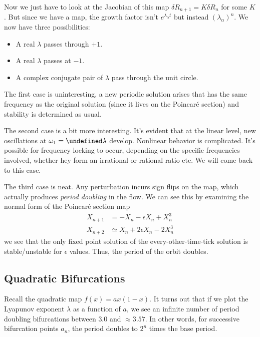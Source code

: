 \documentclass[12pt]{article}
\let\Im\undefined
\DeclareMathOperator{\Im}{Im}
\begin{document}
Now we just have to look at the Jacobian of this map
$\delta R_{n+1} = K \delta R_n$
for some $K$. But since we have a map, the growth factor isn't
$e^{\lambda_\alpha t}$ but instead $(\lambda_\alpha)^n$. We now have three
possibilities:
\begin{itemize}
    \item A real $\lambda$ passes through $+1$.
    \item A real $\lambda$ passes at $-1$.
    \item A complex conjugate pair of $\lambda$ pass through the unit circle.
\end{itemize}

The first case is uninteresting, a new periodic solution arises that has the
same frequency as the original solution (since it lives on the Poincar\'e
section) and stability is determined as usual.

The second case is a bit more interesting. It's evident that at the linear
level, new oscillations at $\omega_1 = \Im \lambda$ develop. Nonlinear behavior
is complicated. It's possible for frequency locking to occur, depending on the
specific frequencies involved, whether hey form an irrational or rational ratio
etc. We will come back to this case.

The third case is neat. Any perturbation incurs sign flips on the map, which
actually produces \emph{period doubling} in the flow. We can see this by
examining the normal form of the Poincar\'e section map
\begin{align}
    X_{n+1} &= -X_n - \epsilon X_n + X_n^3\\
    X_{n+2} &\simeq X_n + 2\epsilon X_n - 2X_n^3
\end{align}
we see that the only fixed point solution of the every-other-time-tick solution
is stable/unstable for $\epsilon$ values. Thus, the period of the orbit doubles.

\clearpage

\subsection{Quadratic Bifurcations}

Recall the quadratic map $f(x) = ax(1-x)$. It turns out that if we plot the
Lyapunov exponent $\lambda$ as a function of $a$, we see an infinite number of
period doubling bifurcations between $3.0$ and $\approx 3.57$. In other words,
for successive bifurcation points $a_n$, the period doubles to $2^n$ times the
base period.
\end{document}
